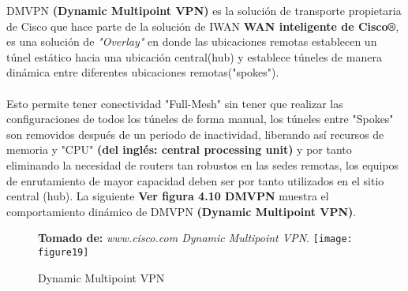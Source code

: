 DMVPN \textbf{(Dynamic Multipoint VPN)} es la solución de transporte propietaria de Cisco que hace parte de la solución de IWAN \textbf{WAN inteligente de Cisco®}, es una solución de \textit{"Overlay"} en donde las ubicaciones remotas establecen un túnel estático hacia una ubicación central(hub) y establece túneles de manera dinámica entre diferentes ubicaciones remotas("spokes").
\\
\\
Esto permite tener conectividad "Full-Mesh" sin tener que realizar las configuraciones de todos los túneles de forma manual, los túneles entre "Spokes" son removidos después de un periodo de inactividad, liberando así recursos de memoria y "CPU" \textbf{(del inglés: central processing unit)} y por tanto eliminando la necesidad de routers tan robustos en las sedes remotas, los equipos de enrutamiento de mayor capacidad deben ser por tanto utilizados en el sitio central (hub). La siguiente \textbf{Ver figura 4.10 DMVPN} muestra el comportamiento dinámico de DMVPN \textbf{(Dynamic Multipoint VPN)}.
\begin{figure}[htbp]
 \textbf{Tomado de:} \textit{www.cisco.com Dynamic Multipoint VPN}.
  \centering
    {\texttt{[image: figure19]}}%
  \caption{\footnotesize{Dynamic Multipoint VPN}}
    \label{fig:dynamic}
\end{figure}

